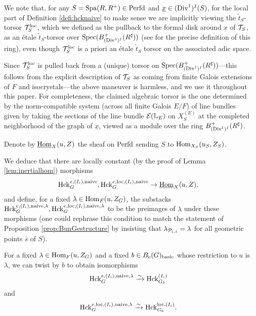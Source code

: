  \begin{rque}
     We note that, for any $S = \mathrm{Spa}(R,R^{+}) \in \mathrm{Perfd}$ and $\underline{x} \in (\textnormal{Div}^{1})^{I}(S)$, for the local part of Definition \ref{defi:hcknaive} to make sense we are implicitly viewing the $\tilde{t}_{S}$-torsor $\mathcal{T}_{S}^{\mathrm{loc}}$, which we defined as the pullback to the formal disk around $\underline{x}$ of $\mathcal{T}_{S}$, as an \' {e}tale $\tilde{t}_{S}$-torsor over $\mathrm{Spec}(B^{+}_{(\mathrm{Div}^{1})^{I}}(R^{\sharp}))$ (see \cite[\S VI.1]{Geometrization} for the precise definition of this ring), even though $\mathcal{T}_{S}^{\mathrm{loc}}$ is a priori an \'{e}tale $\tilde{t}_{S}$ torsor on the associated adic space. 
     
     Since $\mathcal{T}_{S}^{\mathrm{loc}}$ is pulled back from a (unique) torsor on $\mathrm{Spec}(B^{+}_{(\mathrm{Div}^{1})^{I}}(R^{\sharp}))$---this follows from the explicit description of $\mathcal{T}_{S}$ as coming from finite Galois extensions of $F$ and isocrystals---the above maneuver is harmless, and we use it throughout this paper. For completeness, the claimed algebraic torsor is the one determined by the norm-compatible system (across all finite Galois $E/F$) of line bundles given by taking the sections of the line bundle $\mathcal{E}(\mathbb{L}_{E})$ on $X^{(E)}_{S}$ at the completed neighborhood of the graph of $\underline{x}$, viewed as a module over the ring $B^{+}_{(\mathrm{Div}^{1})^{I}}(R^{\sharp})$.
 \end{rque}


\begin{defi}\label{defi:hom} Denote by $\underline{\mathrm{Hom}}_{X}(u,Z)$ the sheaf on $\mathrm{Perfd}$ sending $S$ to $\mathrm{Hom}_{X_{S}}(u_{S},Z_{S})$. 
\end{defi}
We deduce that there are locally constant (by the proof of Lemma \ref{lem:inertialhom}) morphisms
\begin{equation*}
    \mathrm{Hck}_{G}^{e,(I_{i}),\textnormal{naive}}, \mathrm{Hck}_{G}^{e,\mathrm{loc},(I_{i}),\textnormal{naive}}\to \underline{\mathrm{Hom}}_{X}(u,Z),
\end{equation*}
and define, for a fixed $\lambda \in \mathrm{Hom}_{F}(u,Z_{G})$, the substacks $\mathrm{Hck}_{G}^{e,(I_{i}),\textnormal{naive},\lambda}, \mathrm{Hck}_{G}^{e,\mathrm{loc},(I_{i}),\textnormal{naive},\lambda}$ to be the preimages of $\lambda$ under these morphisms (one could rephrase this condition to match the statement of Proposition \ref{prop:BunGestructure} by insisting that $\lambda_{\mathcal{P}_{i,\bar{s}}} = \lambda$ for all geometric points $\bar{s}$ of $S$). 

\begin{lem}\label{lem:naiveHck}
    For a fixed $\lambda \in \mathrm{Hom}_{F}(u,Z_{G})$ and a fixed $b \in B_{e}(G)_{\textnormal{basic}}$ whose restriction to $u$ is $\lambda$, we can twist by $b$ to obtain isomorphisms
    \begin{equation*}
        \mathrm{Hck}_{G}^{e,(I_{i}),\textnormal{naive},\lambda} \xrightarrow{\sim} \mathrm{Hck}_{G_{b}}^{{(I_{i})}}
    \end{equation*}
    and 
    \begin{equation*}
        \mathrm{Hck}_{G}^{e,\mathrm{loc},(I_{i}),\textnormal{naive},\lambda} \xrightarrow{\sim} \mathrm{Hck}_{G_{b}}^{\mathrm{loc},{(I_{i})}}.
    \end{equation*}
\end{lem}

